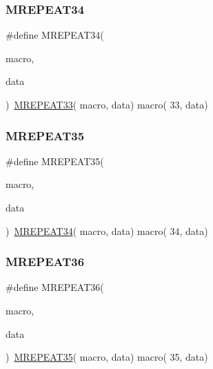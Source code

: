 \mbox{\label{group__group__sam0__utils__mrepeat_gad9540e7ec7a97aade78bdbfb0fbc1649}} 
\subsubsection{\texorpdfstring{MREPEAT34}{MREPEAT34}}
{\footnotesize\ttfamily \#define M\+R\+E\+P\+E\+A\+T34(\begin{DoxyParamCaption}\item[{}]{macro,  }\item[{}]{data }\end{DoxyParamCaption})~\mbox{\hyperlink{group__group__sam0__utils__mrepeat_ga36d12737d2ee8e77fbdef2f18c697164}{M\+R\+E\+P\+E\+A\+T33}}( macro, data)   macro( 33, data)}

\mbox{\label{group__group__sam0__utils__mrepeat_ga20ad71ff8aba1011aa0cb4cf86669f73}} 
\subsubsection{\texorpdfstring{MREPEAT35}{MREPEAT35}}
{\footnotesize\ttfamily \#define M\+R\+E\+P\+E\+A\+T35(\begin{DoxyParamCaption}\item[{}]{macro,  }\item[{}]{data }\end{DoxyParamCaption})~\mbox{\hyperlink{group__group__sam0__utils__mrepeat_gad9540e7ec7a97aade78bdbfb0fbc1649}{M\+R\+E\+P\+E\+A\+T34}}( macro, data)   macro( 34, data)}

\mbox{\label{group__group__sam0__utils__mrepeat_gad01671ded2811e1cabe5d5642ebb4987}} 
\subsubsection{\texorpdfstring{MREPEAT36}{MREPEAT36}}
{\footnotesize\ttfamily \#define M\+R\+E\+P\+E\+A\+T36(\begin{DoxyParamCaption}\item[{}]{macro,  }\item[{}]{data }\end{DoxyParamCaption})~\mbox{\hyperlink{group__group__sam0__utils__mrepeat_ga20ad71ff8aba1011aa0cb4cf86669f73}{M\+R\+E\+P\+E\+A\+T35}}( macro, data)   macro( 35, data)}

